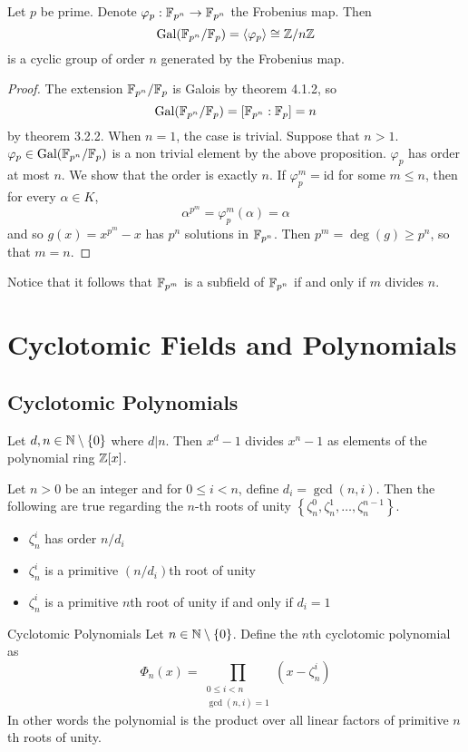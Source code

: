\documentclass[a4paper]{article}
\begin{document}
\begin{thm}{}{} Let $p$ be prime. Denote $\varphi_p:\mathbb{F}_{p^n}\to\mathbb{F}_{p^n}$ the Frobenius map. Then $$\text{Gal}(\mathbb{F}_{p^n}/\mathbb{F}_p)=\langle\varphi_p\rangle\cong\mathbb{Z}/n\mathbb{Z}$$ is a cyclic group of order $n$ generated by the Frobenius map. 
\begin{proof}
The extension $\mathbb{F}_{p^n}/\mathbb{F}_p$ is Galois by theorem 4.1.2, so $$\text{Gal}(\mathbb{F}_{p^n}/\mathbb{F}_p)=[\mathbb{F}_{p^n}:\mathbb{F}_p]=n$$ by theorem 3.2.2. When $n=1$, the case is trivial. Suppose that $n>1$. $\varphi_p\in\text{Gal}(\mathbb{F}_{p^n}/\mathbb{F}_p)$ is a non trivial element by the above proposition. $\varphi_p$ has order at most $n$. We show that the order is exactly $n$. If $\varphi_p^m=\text{id}$ for some $m\leq n$, then for every $\alpha\in K$, $$\alpha^{p^m}=\varphi_p^m(\alpha)=\alpha$$ and so $g(x)=x^{p^m}-x$ has $p^n$ solutions in $\mathbb{F}_{p^n}$. Then $p^m=\deg(g)\geq p^n$, so that $m=n$. 
\end{proof}
\end{thm}

Notice that it follows that $\mathbb{F}_{p^m}$ is a subfield of $\mathbb{F}_{p^n}$ if and only if $m$ divides $n$. 

\pagebreak
\section{Cyclotomic Fields and Polynomials}
\subsection{Cyclotomic Polynomials}
\begin{lmm}{}{} Let $d,n\in\mathbb{N}\setminus\{0\}$ where $d|n$. Then $x^d-1$ divides $x^n-1$ as elements of the polynomial ring $\mathbb{Z}[x]$. 
\end{lmm}

\begin{lmm}{}{} Let $n>0$ be an integer and for $0\leq i<n$, define $d_i=\gcd(n,i)$. Then the following are true regarding the $n$-th roots of unity $\left\{\zeta_n^0,\zeta_n^1,\dots,\zeta_n^{n-1}\right\}$. 
\begin{itemize}
\item $\zeta_n^i$ has order $n/d_i$
\item $\zeta_n^i$ is a primitive $(n/d_i)$th root of unity
\item $\zeta_n^i$ is a primitive $n$th root of unity if and only if $d_i=1$
\end{itemize}
\end{lmm}

\begin{defn}{Cyclotomic Polynomials}{} Let $n\in\mathbb{N}\setminus\{0\}$. Define the $n$th cyclotomic polynomial as $$\Phi_n(x)=\prod_{\substack{0\leq i<n\\\gcd(n,i)=1}}\left(x-\zeta_n^i\right)$$
In other words the polynomial is the product over all linear factors of primitive $n$th roots of unity. 
\end{defn}
\end{document}

